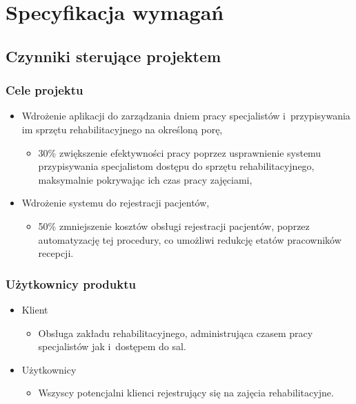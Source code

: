 \section{Specyfikacja wymagań}



\subsection{Czynniki sterujące projektem}

\subsubsection{Cele projektu}

\begin{itemize}
	\item Wdrożenie aplikacji do zarządzania dniem pracy specjalistów
	i~przypisywania im sprzętu rehabilitacyjnego na określoną porę,
	\begin{itemize}
		\item 30\% zwiększenie efektywności pracy poprzez usprawnienie systemu przypisywania specjalistom dostępu do sprzętu rehabilitacyjnego, maksymalnie pokrywając ich czas pracy zajęciami,
	\end{itemize}
	\item Wdrożenie systemu do rejestracji pacjentów,
	\begin{itemize}
		\item 50\% zmniejszenie kosztów obsługi rejestracji pacjentów, poprzez automatyzację tej procedury, co umożliwi redukcję etatów pracowników recepcji.
	\end{itemize}
\end{itemize}

\subsubsection{Użytkownicy produktu}

\begin{itemize}
	\item Klient
	\begin{itemize}
		\item Obsługa zakładu rehabilitacyjnego, administrująca czasem pracy specjalistów jak i~dostępem do sal.
	\end{itemize}
	\item Użytkownicy
	\begin{itemize}
			\item Wszyscy potencjalni klienci rejestrujący się na zajęcia rehabilitacyjne.
	\end{itemize}
\end{itemize}

